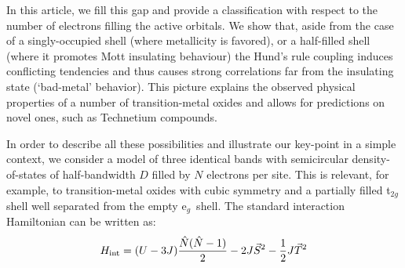 \documentclass[aps,prl,amsmath, amssymb, english, aps, prl, onecolumn,
  reprint,floatfix, superscriptaddress]{revtex4-1}
\def\t2g{t${}_{2g}$}
\def\eg{e$_{g}\,$}
\begin{document}
 In this article, we fill this gap
 and provide a classification with respect to the number of electrons
 filling the active orbitals.  We show that, aside from the case of a
 singly-occupied shell (where metallicity is
 favored\cite{werner09,demedici_MottHund}), or a half-filled shell
 (where it promotes Mott insulating
 behaviour\cite{bunemann_gutzwiller_prb_1998,han_multiorbital}) the
 Hund's rule coupling induces conflicting tendencies and thus causes strong
 correlations far from the insulating state (`bad-metal'
 behavior).  This picture explains the observed physical properties of
 a number of transition-metal oxides and allows for predictions on
 novel ones, such as Technetium compounds.

In order to describe all these possibilities and
illustrate our key-point in a simple context, we %
consider a
model of three identical bands with semicircular density-of-states of
half-bandwidth $D$ filled by $N$ electrons per site.  This is
relevant, for example, to transition-metal oxides with cubic symmetry
and a partially filled \t2g shell well separated from the empty \eg
shell.  The standard interaction Hamiltonian
\cite{imada_mit_review} can be written as:
\begin{equation}
  H_{\rm int}= (U-3J) \frac{\hat{N}(\hat{N}-1)}{2}  
   -2J \vec{S}^2 -\frac{1}{2}J \vec{T}^2 
\label{eq:hami}
\end{equation}

\end{document}
